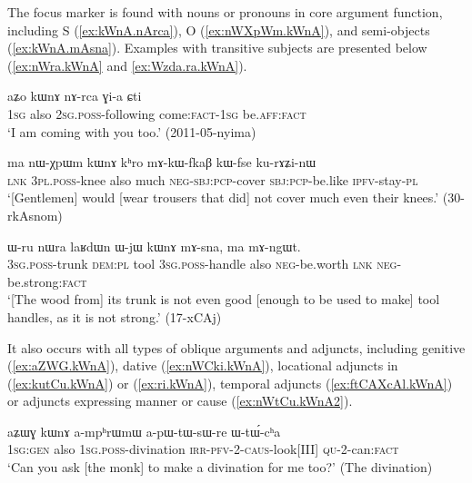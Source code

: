 The focus marker  is found with nouns or pronouns in core argument function, including S (\ref{ex:kWnA.nArca}), O (\ref{ex:nWXpWm.kWnA}), and semi-objects (\ref{ex:kWnA.mAsna}).  Examples with transitive subjects are presented below (\ref{ex:nWra.kWnA} and \ref{ex:Wzda.ra.kWnA}).

 \begin{exe}
\ex \label{ex:kWnA.nArca}
\gll aʑo kɯnɤ nɤ-rca ɣi-a ɕti  \\
\textsc{1sg} also \textsc{2sg}.\textsc{poss}-following come:\textsc{fact}-\textsc{1sg} be.\textsc{aff}:\textsc{fact} \\
\glt `I am coming with you too.' (2011-05-nyima)
 \end{exe}
 
   \begin{exe}
\ex \label{ex:nWXpWm.kWnA}
\gll    ma nɯ-χpɯm kɯnɤ kʰro mɤ-kɯ-fkaβ kɯ-fse ku-rɤʑi-nɯ  \\
\textsc{lnk} \textsc{3pl}.\textsc{poss}-knee also much \textsc{neg}-\textsc{sbj}:\textsc{pcp}-cover \textsc{sbj}:\textsc{pcp}-be.like \textsc{ipfv}-stay-\textsc{pl} \\
\glt `[Gentlemen] would [wear trousers that did] not cover much even their knees.'  (30-rkAsnom) 
  \end{exe}
  
  \begin{exe}
 \ex \label{ex:kWnA.mAsna}
 \gll   ɯ-ru nɯra laʁdɯn ɯ-jɯ kɯnɤ mɤ-sna, ma mɤ-ngɯt. \\
 \textsc{3sg}.\textsc{poss}-trunk \textsc{dem}:\textsc{pl} tool \textsc{3sg}.\textsc{poss}-handle also \textsc{neg}-be.worth \textsc{lnk}  \textsc{neg}-be.strong:\textsc{fact} \\
 \glt `[The wood from] its trunk is not even good [enough to be used to make] tool handles, as it is not strong.'  (17-xCAj)
  \end{exe}

It also occurs with all types of oblique arguments and adjuncts, including genitive  (\ref{ex:aZWG.kWnA}), dative  (\ref{ex:nWCki.kWnA}),  locational adjuncts in  (\ref{ex:kutCu.kWnA}) or  (\ref{ex:ri.kWnA}), temporal adjuncts (\ref{ex:ftCAXcAl.kWnA}) or adjuncts expressing manner or cause (\ref{ex:nWtCu.kWnA2}).  
  
   \begin{exe}
\ex \label{ex:aZWG.kWnA}
\gll aʑɯɣ kɯnɤ a-mpʰrɯmɯ a-pɯ-tɯ-sɯ-re ɯ-tɯ́-cʰa \\
\textsc{1sg}:\textsc{gen} also \textsc{1sg}.\textsc{poss}-divination \textsc{irr}-\textsc{pfv}-2-\textsc{caus}-look[III] \textsc{qu}-2-can:\textsc{fact} \\
\glt `Can you ask [the monk] to make a divination for me too?' (The divination)
\end{exe}  
  
